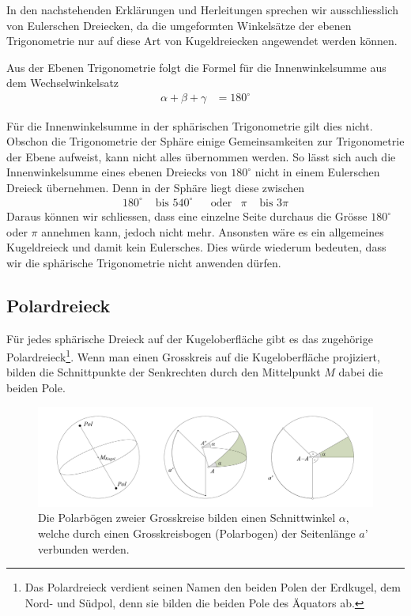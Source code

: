 \begin{refsection}
In den nachstehenden Erklärungen und Herleitungen sprechen wir ausschliesslich von Eulerschen Dreiecken, da die umgeformten Winkelsätze der ebenen Trigonometrie nur auf diese Art von Kugeldreiecken angewendet werden können.

Aus der Ebenen Trigonometrie folgt die Formel für die Innenwinkelsumme aus dem Wechselwinkelsatz
\begin{align*}
\alpha + \beta + \gamma &= 180^{\circ}
\end{align*}

Für die Innenwinkelsumme in der sphärischen Trigonometrie gilt dies nicht. Obschon die Trigonometrie der Sphäre einige Gemeinsamkeiten zur Trigonometrie der Ebene aufweist, kann nicht alles übernommen werden.
So lässt sich auch die Innenwinkelsumme eines ebenen Dreiecks von $180^{\circ}$ nicht in einem Eulerschen Dreieck übernehmen.
Denn in der Sphäre liegt diese zwischen
\[
\begin{aligned}
180^{\circ}
&\text{ bis }
540^{\circ}
&
&\text{oder}
&
\pi
&\text{ bis }
3\pi
\end{aligned}
\]
Daraus können wir schliessen, dass eine einzelne Seite durchaus die Grösse $180^{\circ}$ oder $\pi$ annehmen kann, jedoch nicht mehr. Ansonsten wäre es ein allgemeines Kugeldreieck und damit kein Eulersches. Dies würde wiederum bedeuten, dass wir die sphärische Trigonometrie nicht anwenden dürfen.


\subsection{Polardreieck}
Für jedes sphärische Dreieck auf der Kugeloberfläche gibt es das zugehörige Polardreieck\footnote{%
Das Polardreieck verdient seinen Namen den beiden Polen der Erdkugel, dem Nord- und Südpol, denn sie bilden die beiden Pole des Äquators ab.}. Wenn man einen Grosskreis auf die Kugeloberfläche projiziert, bilden die Schnittpunkte der Senkrechten durch den Mittelpunkt $M$ dabei die beiden Pole. 

\begin{figure}
\centering
\includegraphics[width=1\textwidth]{kugel/Polar.jpg}
\caption{Die Polarbögen zweier Grosskreise bilden einen Schnittwinkel $\alpha$, welche durch einen Grosskreisbogen (Polarbogen) der Seitenlänge $a’$ verbunden werden.}
\label{V8}
\end{figure}


\end{refsection}
